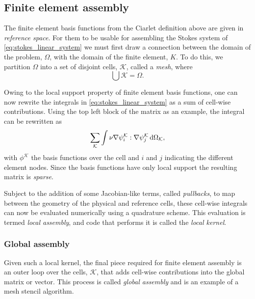 \documentclass[thesis]{subfiles}
\begin{document}

\subsection{Finite element assembly}

The finite element basis functions from the Ciarlet definition above are given in \emph{reference space}.
For them to be usable for assembling the Stokes system of \cref{eq:stokes_linear_system} we must first draw a connection between the domain of the problem, $\Omega$, with the domain of the finite element, $K$.
To do this, we partition $\Omega$ into a set of disjoint cells, $\mathcal{K}$, called a \emph{mesh}, where
\begin{equation*}
  \bigcup \mathcal{K} = \Omega.
\end{equation*}

Owing to the local support property of finite element basis functions, one can now rewrite the integrals in \cref{eq:stokes_linear_system} as a sum of cell-wise contributions.
Using the top left block of the matrix as an example, the integral can be rewritten as
\begin{equation}
  \sum_{\mathcal{K}} \int \nu \nabla \psi_i^{\mathcal{K}} : \nabla \psi_j^{\mathcal{K}} \, \textnormal{d}\Omega_{\mathcal{K}},
\end{equation}
with $\phi^{\mathcal{K}}$ the basis functions over the cell and $i$ and $j$ indicating the different element nodes.
Since the basis functions have only local support the resulting matrix is \emph{sparse}.

Subject to the addition of some Jacobian-like terms, called \emph{pullbacks}, to map between the geometry of the physical and reference cells, these cell-wise integrals can now be evaluated numerically using a quadrature scheme.
This evaluation is termed \emph{local assembly}, and code that performs it is called the \emph{local kernel}.

\subsubsection{Global assembly}

Given such a local kernel, the final piece required for finite element assembly is an outer loop over the cells, $\mathcal{K}$, that adds cell-wise contributions into the global matrix or vector.
This process is called \emph{global assembly} and is an example of a mesh stencil algorithm.
\end{document}
